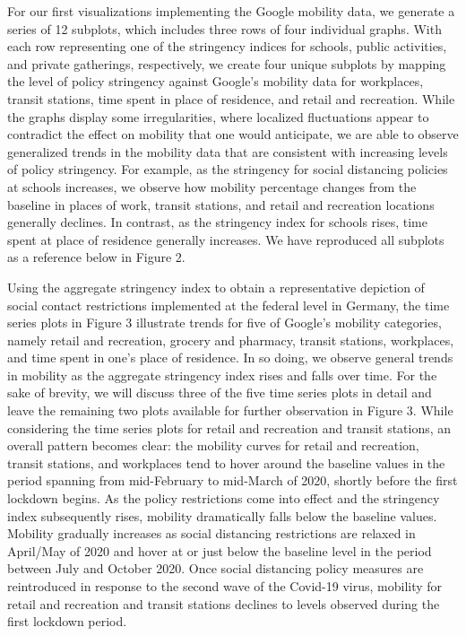 For our first visualizations implementing the Google mobility data, we generate a series of 12 subplots, which includes three rows of four individual graphs. With each row representing one of the stringency indices for schools, public activities, and private gatherings, respectively, we create four unique subplots by mapping the level of policy stringency against Google’s mobility data for workplaces, transit stations, time spent in place of residence, and retail and recreation. While the graphs display some irregularities, where localized fluctuations appear to contradict the effect on mobility that one would anticipate, we are able to observe generalized trends in the mobility data that are consistent with increasing levels of policy stringency. For example, as the stringency for social distancing policies at schools increases, we observe how mobility percentage changes from the baseline in places of work, transit stations, and retail and recreation locations generally declines. In contrast, as the stringency index for schools rises, time spent at place of residence generally increases. We have reproduced all subplots as a reference below in Figure 2. 

Using the aggregate stringency index to obtain a representative depiction of social contact restrictions implemented at the federal level in Germany, the time series plots in Figure 3 illustrate trends for five of Google’s mobility categories, namely retail and recreation, grocery and pharmacy, transit stations, workplaces, and time spent in one’s place of residence. In so doing, we observe general trends in mobility as the aggregate stringency index rises and falls over time. For the sake of brevity, we will discuss three of the five time series plots in detail and leave the remaining two plots available for further observation in Figure 3. While considering the time series plots for retail and recreation and transit stations, an overall pattern becomes clear: the mobility curves for retail and recreation, transit stations, and workplaces tend to hover around the baseline values in the period spanning from mid-February to mid-March of 2020, shortly before the first lockdown begins. As the policy restrictions come into effect and the stringency index subsequently rises, mobility dramatically falls below the baseline values. Mobility gradually increases as social distancing restrictions are relaxed in April/May of 2020 and hover at or just below the baseline level in the period between July and October 2020. Once social distancing policy measures are reintroduced in response to the second wave of the Covid-19 virus, mobility for retail and recreation and transit stations declines to levels observed during the first lockdown period. 

